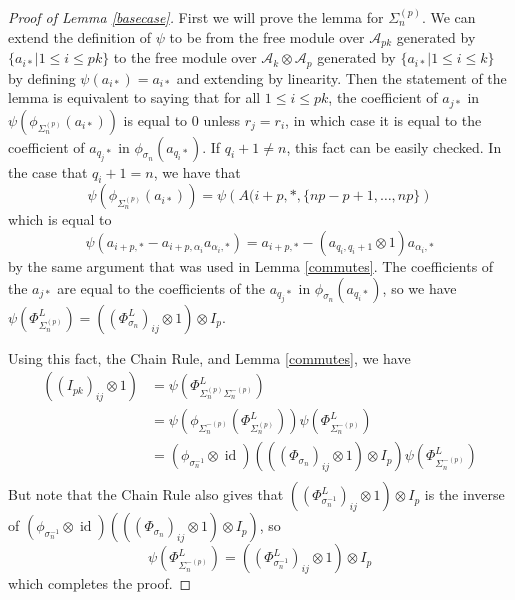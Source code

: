 \documentclass{amsart}[11pt,fullpage]
\def\ltblue{blue!20!white}
\def\A{{\mathcal A}}
\def\s{{\sigma}}
\def\a{\alpha}
\newcommand\id{\operatorname{id}}
\newcommand\Sp{\Sigma^{(p)}}
\newcommand\SpM{\Sigma^{-(p)}}
\theoremstyle{definition}
\begin{document}
\begin{proof} [Proof of Lemma \ref{basecase}]\todo[color=\ltblue]{check}
First we will prove the lemma for $\Sp_n$. We can extend the definition of $\psi$ to be from the free module over $\A_{pk}$ generated by $\{a_{i*}|1\le i\le pk\}$ to the free module over $\A_{k}\otimes \A_{p}$ generated by $\{a_{i*}|1\le i\le k\}$ by defining $\psi(a_{i*}) = a_{i*}$ and extending by linearity. Then the statement of the lemma is equivalent to saying that for all $1\le i\le pk$, the coefficient of $a_{j*}$ in $\psi\left(\phi_{\Sp_n}(a_{i*})\right)$ is equal to 0 unless $r_j = r_i$, in which case it is equal to the coefficient of $a_{q_j*}$ in $\phi_{\s_n}(a_{q_i*})$. If $q_i + 1 \ne n$, this fact can be easily checked. In the case that $q_i + 1 = n$, we have that
$$\psi\left(\phi_{\Sp_n}(a_{i*})\right) = \psi\left(A(i+p,*,\{np-p+1,\ldots,np\}\right)$$
\noindent which is equal to
$$\psi(a_{i+p,*} - a_{i+p,\a_i}a_{\a_i,*}) = a_{i+p,*} - (a_{q_i,q_i+1}\otimes 1)a_{\a_i,*}$$
by the same argument that was used in Lemma \ref{commutes}. The coefficients of the $a_{j*}$ are equal to the coefficients of the $a_{q_j*}$ in $\phi_{\s_n}(a_{q_i*})$, so we have $\psi\left(\Phi_{\Sp_n}^L\right) = \left(\left(\Phi_{\s_n}^L\right)_{ij}\otimes 1\right)\otimes I_p$.

Using this fact, the Chain Rule, and Lemma \ref{commutes}, we have
\begin{align*}
\left(\left(I_{pk}\right)_{ij}\otimes 1\right) &= \psi\left(\Phi_{\Sp_n\SpM_n}^L\right)\\
&= \psi\left(\phi_{\SpM_n}\left(\Phi_{\Sp_n}^L\right)\right)\psi\left(\Phi_{\SpM_n}^L\right)\\
&= \left(\phi_{\s_n^{-1}}\otimes \id\right)\left(\left(\left(\Phi_{\s_n}\right)_{ij}\otimes 1\right)\otimes I_p\right)\psi\left(\Phi_{\SpM_n}^L\right)\\
\end{align*}
But note that the Chain Rule also gives that $\left(\left(\Phi_{\s_n^{-1}}^L\right)_{ij}\otimes 1\right)\otimes I_p$ is the inverse of $\left(\phi_{\s_n^{-1}}\otimes \id\right)\left(\left(\left(\Phi_{\s_n}\right)_{ij}\otimes 1\right)\otimes I_p\right)$, so 
$$\psi\left(\Phi_{\SpM_n}^L\right) = \left(\left(\Phi_{\s_n^{-1}}^L\right)_{ij}\otimes 1\right)\otimes I_p$$
\noindent which completes the proof.
\end{proof}
\end{document}
